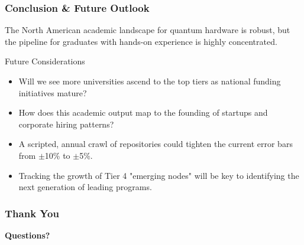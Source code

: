\documentclass[aspectratio=169]{beamer}
\begin{document}
\begin{frame}
    \frametitle{Conclusion \& Future Outlook}
    The North American academic landscape for quantum hardware is robust, but the pipeline for graduates with hands-on experience is highly concentrated.
    
    \begin{block}{Future Considerations}
        \begin{itemize}
            \item Will we see more universities ascend to the top tiers as national funding initiatives mature?
            \item How does this academic output map to the founding of startups and corporate hiring patterns?
            \item A scripted, annual crawl of repositories could tighten the current error bars from $\pm$10\% to $\pm$5\%.
            \item Tracking the growth of Tier 4 "emerging nodes" will be key to identifying the next generation of leading programs.
        \end{itemize}
    \end{block}
    
\end{frame}

\begin{frame}
    \frametitle{Thank You}
    
    \vfill
    
    \begin{center}
        \Huge \textbf{Questions?}
    \end{center}
    
    \vfill
    
\end{frame}
\end{document}
